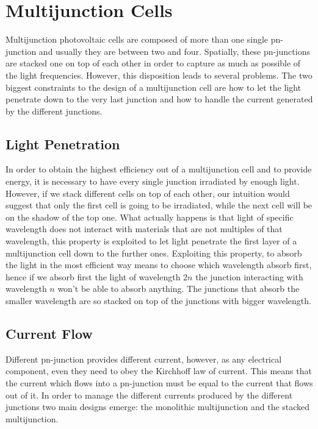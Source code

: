 \documentclass[11pt]{article} %
\begin{document}
\section{Multijunction Cells}

Multijunction photovoltaic cells are composed of more than one single pn-junction and usually they are between two and four. Spatially, these pn-junctions are stacked one on top of each other in order to capture as much as possible of the light frequencies. However, this disposition leads to several problems. The two biggest constraints to the design of a multijunction cell are how to let the light penetrate down to the very last junction and how to handle the current generated by the different junctions.

\subsection{Light Penetration}

In order to obtain the highest efficiency out of a multijunction cell and to provide energy, it is necessary to have every single junction irradiated by enough light. 
However, if we stack different cells on top of each other, our intuition would suggest that only the first cell is going to be irradiated, while the next cell will be on the shadow of the top one.  
What actually happens is that light of specific wavelength does not interact with materials that are not multiples of that wavelength, this property is exploited to let light penetrate the first layer of a multijunction cell down to the further ones.  Exploiting this property, to absorb the light in the most efficient way means to choose which wavelength absorb first, hence if we absorb first the light of wavelength $2n$ the junction interacting with wavelength $n$ won't be able to absorb anything. The junctions that absorb the smaller wavelength are so stacked on top of the junctions with bigger wavelength.  

\subsection{Current Flow}

Different pn-junction provides different current, however, as any electrical component, even they need to obey the Kirchhoff law of current. This means that the current which flows into a pn-junction must be equal to the current that flows out of it.  In order to manage the different currents produced by the different junctions two main designs emerge: the monolithic multijunction and the stacked multijunction. 
\end{document}
